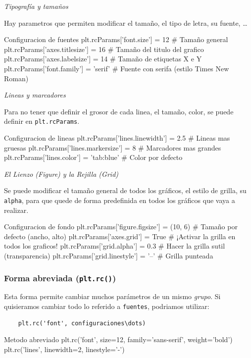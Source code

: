 \emph{Tipografía y tamaños}

Hay parametros que permiten modificar el tamaño, el tipo de letra, su fuente, \dots
\begin{pycode}{Configuracion de fuentes}
plt.rcParams['font.size'] = 12          # Tamaño general
plt.rcParams['axes.titlesize'] = 16    # Tamaño del titulo del grafico
plt.rcParams['axes.labelsize'] = 14    # Tamaño de etiquetas X e Y
plt.rcParams['font.family'] = 'serif'   # Fuente con serifa (estilo Times New Roman)
\end{pycode}

\emph{Lineas y marcadores}

Para no tener que definir el grosor de cada linea, el tamaño, color, se puede definir en \texttt{plt.rcParams}.
\begin{pycode}{Configuracion de lineas}
plt.rcParams['lines.linewidth'] = 2.5   # Lineas mas gruesas
plt.rcParams['lines.markersize'] = 8     # Marcadores mas grandes
plt.rcParams['lines.color'] = 'tab:blue' # Color por defecto
\end{pycode}

\emph{El Lienzo (Figure) y la Rejilla (Grid)}

Se puede modificar el tamaño general de todos los gráficos, el estilo de grilla, su \texttt{alpha}, para que quede de forma predefinida en todos los gráficos que vaya a realizar.
\begin{pycode}{Configuracion de fondo}
plt.rcParams['figure.figsize'] = (10, 6) # Tamaño por defecto (ancho, alto)
plt.rcParams['axes.grid'] = True          # ¡Activar la grilla en todos los graficos!
plt.rcParams['grid.alpha'] = 0.3          # Hacer la grilla sutil (transparencia)
plt.rcParams['grid.linestyle'] = '--'     # Grilla punteada
\end{pycode}

\subsubsection{Forma abreviada (\texttt{plt.rc()})}

Esta forma permite cambiar muchos parámetros de un mismo \textit{grupo}. Si quisieramos cambiar todo lo referido a \texttt{fuentes}, podriamos utilizar:
\begin{verbatim}
    plt.rc('font', configuraciones\dots)
\end{verbatim}
\begin{pycode}{Metodo abreviado}
plt.rc('font', size=12, family='sans-serif', weight='bold')
plt.rc('lines', linewidth=2, linestyle='-')
\end{pycode}


